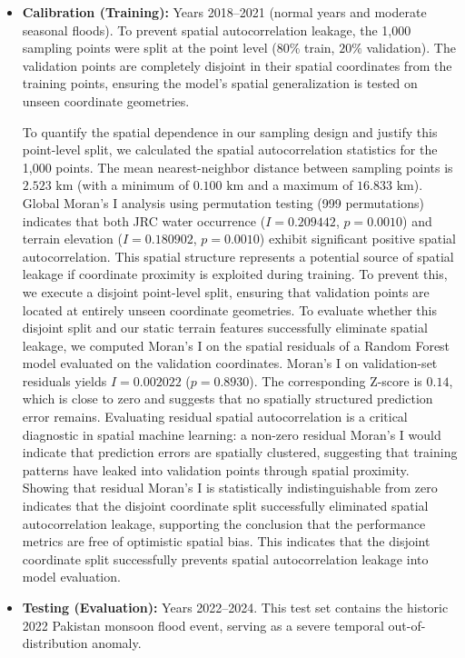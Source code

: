 \begin{itemize}
    \item \textbf{Calibration (Training):} Years 2018--2021 (normal years and moderate seasonal floods). To prevent spatial autocorrelation leakage, the 1,000 sampling points were split at the point level ($80\%$ train, $20\%$ validation). The validation points are completely disjoint in their spatial coordinates from the training points, ensuring the model's spatial generalization is tested on unseen coordinate geometries.
    
    To quantify the spatial dependence in our sampling design and justify this point-level split, we calculated the spatial autocorrelation statistics for the 1,000 points. The mean nearest-neighbor distance between sampling points is $2.523\text{ km}$ (with a minimum of $0.100\text{ km}$ and a maximum of $16.833\text{ km}$). Global Moran's I analysis using permutation testing (999 permutations) indicates that both JRC water occurrence ($I = 0.209442$, $p = 0.0010$) and terrain elevation ($I = 0.180902$, $p = 0.0010$) exhibit significant positive spatial autocorrelation. This spatial structure represents a potential source of spatial leakage if coordinate proximity is exploited during training. To prevent this, we execute a disjoint point-level split, ensuring that validation points are located at entirely unseen coordinate geometries. To evaluate whether this disjoint split and our static terrain features successfully eliminate spatial leakage, we computed Moran's I on the spatial residuals of a Random Forest model evaluated on the validation coordinates. Moran's I on validation-set residuals yields $I = 0.002022$ ($p = 0.8930$). The corresponding Z-score is $0.14$, which is close to zero and suggests that no spatially structured prediction error remains. Evaluating residual spatial autocorrelation is a critical diagnostic in spatial machine learning: a non-zero residual Moran's I would indicate that prediction errors are spatially clustered, suggesting that training patterns have leaked into validation points through spatial proximity. Showing that residual Moran's I is statistically indistinguishable from zero indicates that the disjoint coordinate split successfully eliminated spatial autocorrelation leakage, supporting the conclusion that the performance metrics are free of optimistic spatial bias. This indicates that the disjoint coordinate split successfully prevents spatial autocorrelation leakage into model evaluation.
    \item \textbf{Testing (Evaluation):} Years 2022--2024. This test set contains the historic 2022 Pakistan monsoon flood event, serving as a severe temporal out-of-distribution anomaly.
\end{itemize}

 
